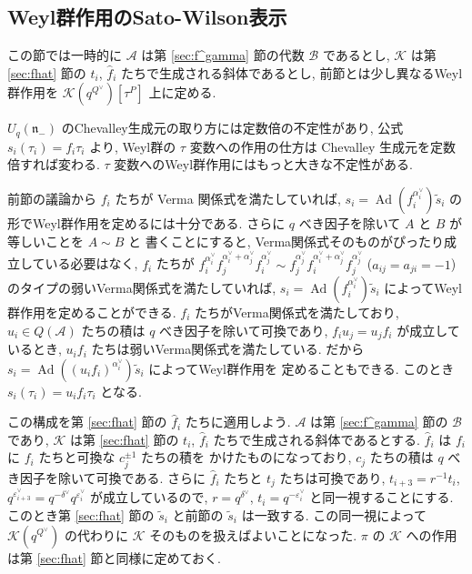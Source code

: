 \documentclass[12pt,twoside,dvipdfm]{msjproc}
\theoremstyle{definition} %
\theoremstyle{definition} %
\theoremstyle{definition} %
\numberwithin{theorem}{section}
\numberwithin{equation}{section}
\numberwithin{figure}{section}
\numberwithin{table}{section}
\newcommand\secref[1]{第 \ref{#1} 節}
\newcommand\nil{\mathfrak{n}}
\newcommand\A{\mathcal{A}}
\newcommand\K{\mathcal{K}}
\newcommand\B{\mathcal{B}}
\newcommand\Ad{\mathop{\mathrm{Ad}}\nolimits}
\newcommand\ts{{\tilde{s}}}
\newcommand\hf{{\hat{f}}}
\newcommand\ev{\varepsilon^\vee}
\newcommand\av{\alpha^\vee}
\newcommand\dv{\delta^\vee}
\newcommand\Qv{{Q^\vee}}
\begin{document}
\subsection{Weyl群作用のSato-Wilson表示}
\label{sec:Sato-Wilson}

この節では一時的に $\A$ は\secref{sec:f^gamma}の代数 $\B$ であるとし, 
$\K$ は\secref{sec:fhat}の $t_i$, $\hf_i$ たちで生成される斜体であるとし, 
前節とは少し異なるWeyl群作用を $\K(q^\Qv)[\tau^P]$ 上に定める.

$U_q(\nil_-)$ のChevalley生成元の取り方には定数倍の不定性があり, 
公式 $s_i(\tau_i)=f_i\tau_i$ より, 
Weyl群の $\tau$ 変数への作用の仕方は Chevalley 生成元を定数倍すれば変わる.
$\tau$ 変数へのWeyl群作用にはもっと大きな不定性がある.

前節の議論から $f_i$ たちが Verma 関係式を満たしていれば, 
$s_i=\Ad(f_i^{\av_i})\ts_i$ の形でWeyl群作用を定めるには十分である.
さらに $q$ べき因子を除いて $A$ と $B$ が等しいことを $A\sim B$ と
書くことにすると, Verma関係式そのものがぴったり成立している必要はなく, 
$f_i$ たちが \(
      f_i^{\av_i} f_j^{\av_i+\av_j} f_i^{\av_j}
 \sim f_j^{\av_j} f_i^{\av_i+\av_j} f_j^{\av_j}
\) ($a_{ij}=a_{ji}=-1$) のタイプの弱いVerma関係式を満たしていれば, 
$s_i=\Ad(f_i^{\av_i})\ts_i$ によってWeyl群作用を定めることができる.
$f_i$ たちがVerma関係式を満たしており, 
$u_i\in Q(\A)$ たちの積は $q$ べき因子を除いて可換であり, 
$f_iu_j=u_jf_i$ が成立しているとき, 
$u_if_i$ たちは弱いVerma関係式を満たしている.
だから $s_i=\Ad((u_if_i)^{\av_i})\ts_i$ によってWeyl群作用を
定めることもできる. このとき $s_i(\tau_i)=u_if_i\tau_i$ となる.

この構成を\secref{sec:fhat}の $\hf_i$ たちに適用しよう.
$\A$ は\secref{sec:f^gamma}の $\B$ であり, 
$\K$ は\secref{sec:fhat}の $t_i$, $\hf_i$ たちで生成される斜体であるとする.
$\hf_i$ は $f_i$ に $f_i$ たちと可換な $c_j^{\pm1}$ たちの積を
かけたものになっており, $c_j$ たちの積は $q$ べき因子を除いて可換である.
さらに $\hf_i$ たちと $t_j$ たちは可換であり, $t_{i+3}=r^{-1}t_i$, 
$q^{\ev_{i+3}}=q^{-\dv}q^{\ev_i}$ が成立しているので, 
$r=q^{\dv}$, $t_i=q^{-\ev_i}$ と同一視することにする.
このとき\secref{sec:fhat}の $\ts_i$ と前節の $\ts_i$ は一致する.
この同一視によって $\K(q^\Qv)$ の代わりに $\K$ そのものを扱えばよいことになった.
$\pi$ の $\K$ への作用は\secref{sec:fhat}と同様に定めておく.
\end{document}
